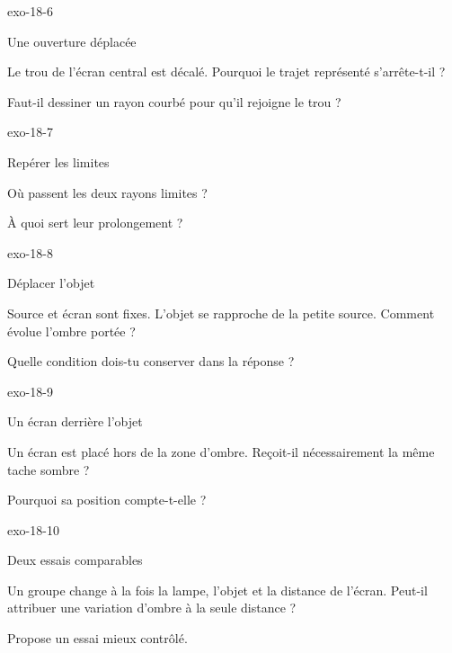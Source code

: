 \documentclass[12pt,twoside,openany]{book}
\begin{document}
\begin{blocLivre}{exo-18-6}
\begin{exercice}[2]{Une ouverture déplacée}
\begin{questions}
\item Le trou de l’écran central est décalé. Pourquoi le trajet représenté s’arrête-t-il ?
\item Faut-il dessiner un rayon courbé pour qu’il rejoigne le trou ?
\end{questions}
\end{exercice}\end{blocLivre}
\begin{blocLivre}{exo-18-7}
\begin{exercice}[2]{Repérer les limites}
\begin{questions}
\item Où passent les deux rayons limites ?
\item À quoi sert leur prolongement ?
\end{questions}
\end{exercice}\end{blocLivre}
\begin{blocLivre}{exo-18-8}
\begin{exercice}[2]{Déplacer l’objet}
\begin{questions}
\item Source et écran sont fixes. L’objet se rapproche de la petite source. Comment évolue l’ombre portée ?
\item Quelle condition dois-tu conserver dans la réponse ?
\end{questions}
\end{exercice}\end{blocLivre}
\begin{blocLivre}{exo-18-9}
\begin{exercice}[2]{Un écran derrière l’objet}
\begin{questions}
\item Un écran est placé hors de la zone d’ombre. Reçoit-il nécessairement la même tache sombre ?
\item Pourquoi sa position compte-t-elle ?
\end{questions}
\end{exercice}\end{blocLivre}
\begin{blocLivre}{exo-18-10}
\begin{exercice}[2]{Deux essais comparables}
\begin{questions}
\item Un groupe change à la fois la lampe, l’objet et la distance de l’écran. Peut-il attribuer une variation d’ombre à la seule distance ?
\item Propose un essai mieux contrôlé.
\end{questions}
\end{exercice}\end{blocLivre}
\end{document}
